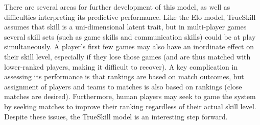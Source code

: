 \documentclass[12pt,letterpaper]{article}
\begin{document}
There are several areas for further development of this model, as well as difficulties interpreting its predictive performance. Like the Elo model, TrueSkill assumes that skill is a uni-dimensional latent trait, but in multi-player games several skill sets (such as game skills and communication skills) could be at play simultaneously. A player's first few games may also have an inordinate effect on their skill level, especially if they lose those games (and are thus matched with lower-ranked players, making it difficult to recover). A key complication in assessing its performance is that rankings are based on match outcomes, but assignment of players and teams to matches is also based on rankings (close matches are desired). Furthermore, human players may seek to game the system by seeking matches to improve their ranking regardless of their actual skill level. Despite these issues, the TrueSkill model is an interesting step forward. 
\end{document}
